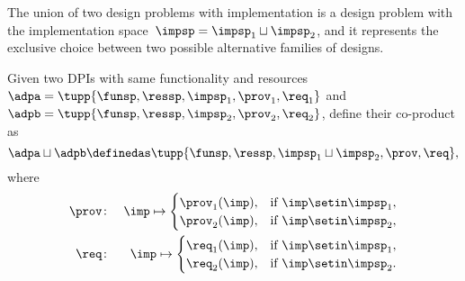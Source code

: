 
The union of two design problems with implementation is a design problem with the implementation space~$\impsp=\impsp_{1}\sqcup\impsp_{2}$, and it represents the exclusive choice between two possible alternative families of designs.

\begin{definition}
    \label{def:parallel-1}
    Given two DPIs with same functionality and resources~$\adpa=\tupp{\funsp,\ressp,\impsp_{1},\prov_{1},\req_{1}}$ and~$\adpb=\tupp{\funsp,\ressp,\impsp_{2},\prov_{2},\req_{2}}$, define their co-product as
    \begin{equation}
        \adpa\sqcup\adpb\definedas\tupp{\funsp,\ressp,\impsp_{1}\sqcup\impsp_{2},\prov,\req} ,
    \end{equation}
    where
    \begin{eqnarray}
        \prov & \colon & \imp\mapsto\begin{cases}
                                        \prov_{1}(\imp), & \text{if }\imp\setin\impsp_{1}, \\
                                        \prov_{2}(\imp), & \text{if }\imp\setin\impsp_{2},
                                    \end{cases}\label{eq:dppar-exec-1} \\
        \req  & \colon & \imp\mapsto\begin{cases}
                                        \req_{1}(\imp), & \text{if }\imp\setin\impsp_{1}, \\
                                        \req_{2}(\imp), & \text{if }\imp\setin\impsp_{2}.
                                    \end{cases}\nonumber
    \end{eqnarray}
\end{definition}

%

\begin{figure}[h!]
    \centering
    \caption{}
    \label{fig:dpcoproduct}
\end{figure}

